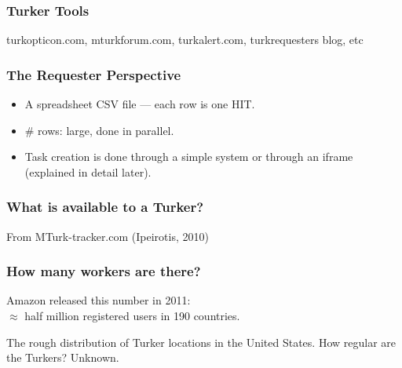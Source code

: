 \documentclass[slides]{beamer} %
\begin{document}
\begin{frame}\frametitle{Turker Tools}

\centering
turkopticon.com, mturkforum.com, turkalert.com, turkrequesters blog, etc

\vspace{-0.5cm}
\vspace{-0.3cm}

\end{frame}

\begin{frame}\frametitle{The Requester Perspective}


\vspace{-0.3cm}
\begin{itemize}
\item A spreadsheet CSV file --- each row is one HIT. \pause
\item \# rows: large, done in parallel. \pause
\item Task creation is done through a simple system or through an iframe (explained in detail later).
\end{itemize}

\end{frame}

\begin{frame}\frametitle{What is available to a Turker?}

From MTurk-tracker.com (Ipeirotis, 2010)

\vspace{-0.2cm}
\vspace{-0.6cm}

\end{frame}

\begin{frame}\frametitle{How many workers are there?}
\pause 
\centering

Amazon released this number in 2011: \\
$\approx$ half million registered users in 190 countries.  \pause


The rough distribution of Turker locations in the United States. How regular are the Turkers? Unknown.

\end{frame}
\end{document}
